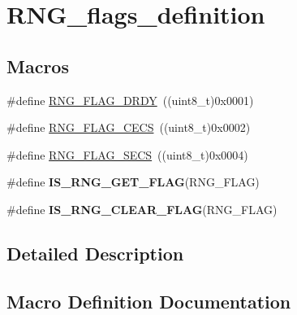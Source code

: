 \hypertarget{group___r_n_g__flags__definition}{}\section{R\+N\+G\+\_\+flags\+\_\+definition}
\label{group___r_n_g__flags__definition}
\subsection*{Macros}
\begin{DoxyCompactItemize}
\item 
\#define \hyperlink{group___r_n_g__flags__definition_ga25845be03c05930bde3c03975eb6c44f}{R\+N\+G\+\_\+\+F\+L\+A\+G\+\_\+\+D\+R\+D\+Y}~((uint8\+\_\+t)0x0001)
\item 
\#define \hyperlink{group___r_n_g__flags__definition_ga4d4d7142b6c50bf0f421a1b668b3ff42}{R\+N\+G\+\_\+\+F\+L\+A\+G\+\_\+\+C\+E\+C\+S}~((uint8\+\_\+t)0x0002)
\item 
\#define \hyperlink{group___r_n_g__flags__definition_ga0a3a6b3d5e584f04546cbcfe0b4fdac3}{R\+N\+G\+\_\+\+F\+L\+A\+G\+\_\+\+S\+E\+C\+S}~((uint8\+\_\+t)0x0004)
\item 
\#define {\bfseries I\+S\+\_\+\+R\+N\+G\+\_\+\+G\+E\+T\+\_\+\+F\+L\+A\+G}(R\+N\+G\+\_\+\+F\+L\+A\+G)
\item 
\#define {\bfseries I\+S\+\_\+\+R\+N\+G\+\_\+\+C\+L\+E\+A\+R\+\_\+\+F\+L\+A\+G}(R\+N\+G\+\_\+\+F\+L\+A\+G)
\end{DoxyCompactItemize}


\subsection{Detailed Description}


\subsection{Macro Definition Documentation}
\hypertarget{group___r_n_g__flags__definition_gabf70e291bc05206bfccf1ac8ab5bba18}{}

